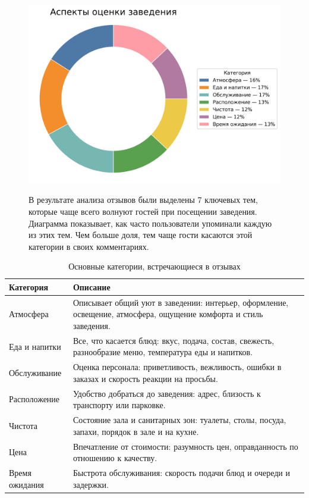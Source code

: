 \documentclass[a4paper,12pt]{extarticle}
\begin{document}
\begin{figure}[H]
    \centering
        \begin{minipage}{0.48\textwidth}
        \includegraphics[width=\linewidth]{images/49543885926/category_donut_chart.png}
    \end{minipage}
    \hfill
        \begin{minipage}{0.45\textwidth}
        \small
        \vspace{1em}
    В результате анализа отзывов были выделены 7 ключевых тем, которые чаще всего волнуют гостей при посещении заведения.
    Диаграмма показывает, как часто пользователи упоминали каждую из этих тем. Чем больше доля, тем чаще гости касаются этой категории в своих комментариях.
    \end{minipage}%
\end{figure}

\begin{table}[H]
\centering
\caption*{Основные категории, встречающиеся в отзывах}
\renewcommand{\arraystretch}{1.4}
\begin{tabular}{p{3.5cm}p{12cm}}
\toprule
\textbf{Категория} & \textbf{Описание} \\
\midrule
Атмосфера & Описывает общий уют в заведении: интерьер, оформление, освещение, атмосфера, ощущение комфорта и стиль заведения. \\
Еда и напитки & Все, что касается блюд: вкус, подача, состав, свежесть, разнообразие меню, температура еды и напитков. \\
Обслуживание & Оценка персонала: приветливость, вежливость, ошибки в заказах и скорость реакции на просьбы. \\
Расположение & Удобство добраться до заведения: адрес, близость к транспорту или парковке. \\
Чистота & Состояние зала и санитарных зон: туалеты, столы, посуда, запахи, порядок в зале и на кухне. \\
Цена & Впечатление от стоимости: разумность цен, оправданность по отношению к качеству. \\
Время ожидания & Быстрота обслуживания: скорость подачи блюд и очереди и задержки. \\
\bottomrule
\end{tabular}
\end{table}
\end{document}

